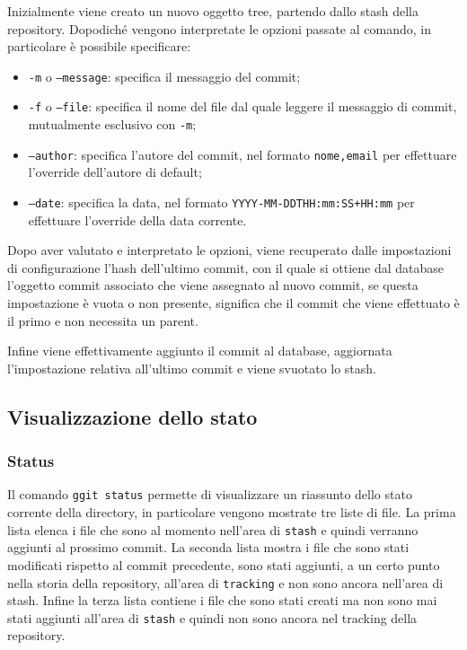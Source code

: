Inizialmente viene creato un nuovo oggetto tree, partendo dallo stash della repository. Dopodiché vengono interpretate le opzioni passate al comando, in particolare è possibile specificare:
\begin{itemize}
    \item \texttt{-m} o \texttt{--message}: specifica il messaggio del commit;
    \item \texttt{-f} o \texttt{--file}: specifica il nome del file dal quale leggere il messaggio di commit, mutualmente esclusivo con \texttt{-m};
    \item \texttt{--author}: specifica l'autore del commit, nel formato \texttt{nome,email} per effettuare l'override dell'autore di default;
    \item \texttt{--date}: specifica la data, nel formato \texttt{YYYY-MM-DDTHH:mm:SS+HH:mm} per effettuare l'override della data corrente.
\end{itemize}
Dopo aver valutato e interpretato le opzioni, viene recuperato dalle impostazioni di configurazione l'hash dell'ultimo commit, con il quale si ottiene dal database l'oggetto commit associato che viene assegnato al nuovo commit, se questa impostazione è vuota o non presente, significa che il commit che viene effettuato è il primo e non necessita un parent.

Infine viene effettivamente aggiunto il commit al database, aggiornata l'impostazione relativa all'ultimo commit e viene svuotato lo stash.

\subsection{Visualizzazione dello stato}
\subsubsection{Status}
Il comando \texttt{ggit status} permette di visualizzare un riassunto dello stato corrente della directory, in particolare vengono mostrate tre liste di file.
La prima lista elenca i file che sono al momento nell'area di \texttt{stash} e quindi verranno aggiunti al prossimo commit.
La seconda lista mostra i file che sono stati modificati rispetto al commit precedente, sono stati aggiunti, a un certo punto nella storia della repository, all'area di \texttt{tracking} e non sono ancora nell'area di stash. Infine la terza lista contiene i file che sono stati creati ma non sono mai stati aggiunti all'area di \texttt{stash} e quindi non sono ancora nel tracking della repository.

